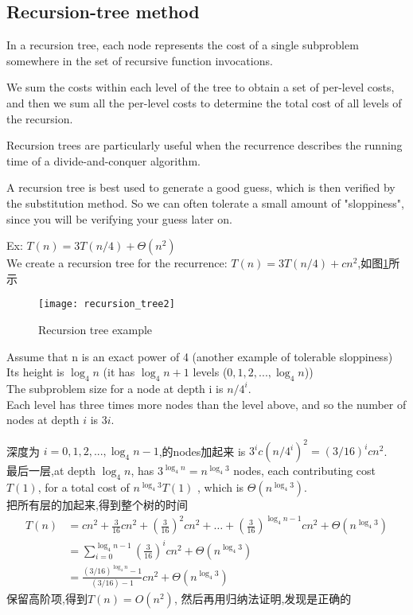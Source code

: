 \documentclass{article}
\begin{document}
\subsection{Recursion-tree method}
In a recursion tree, each node represents the cost of a single subproblem somewhere in the set of recursive function invocations.

We sum the costs within each level of the tree to obtain a set of per-level costs, and then we sum all the per-level costs to
determine the total cost of all levels of the recursion.

Recursion trees are particularly useful when the recurrence describes the running time of a divide-and-conquer algorithm.

A recursion tree is best used to generate a good guess,
which is then verified by the substitution method. So we can often tolerate a small amount of "sloppiness", since you will be verifying your guess later on.

Ex:
$T(n) = 3T(n/4) + \Theta(n^2)$\\
We create a recursion tree for the recurrence: $T(n) = 3T(n/4) + cn^2$,如图\ref{fig.compute.recursion_tree2}所示
\begin{figure}[htbp]
  \centering
  \texttt{[image: recursion\_tree2]}\\
  \caption{Recursion tree example}\label{fig.compute.recursion_tree2}
\end{figure}

Assume that n is an exact power of 4 (another example of tolerable sloppiness)\\
Its height is $\log_4 n$ (it has $\log_4 n + 1$ levels ($0, 1, 2,..., \log_4 n$))\\
The subproblem size for a node at depth i is $n/4^i$.\\
Each level has three times more nodes than the level above, and so the number of nodes at depth $i$ is $3i$.

深度为 $i = 0, 1, 2,..., \log_4 n - 1$,的nodes加起来 is $3^i c(n/4^i)^2 = (3/16)^icn^2$.\\
最后一层,at depth $\log_4n$, has $3^{\log_4 n} = n^{\log_4 3}$ nodes, each contributing cost $T(1)$, for a total cost of $n^{\log_4 3}T(1)$ , which is $\Theta(n^{\log_4 3})$.\\
把所有层的加起来,得到整个树的时间
\begin{equation}
\begin{split}
		T(n) & = cn^2 + \frac{3}{16} cn^2 + (\frac{3}{16})^2 cn^2 + \dots + (\frac{3}{16})^{\log_4 n - 1}cn^2 + \Theta(n^{\log_4 3}) \\
				   & = \sum_{i=0}^{\log_4 n - 1}(\frac{3}{16})^i cn^2 + \Theta(n^{\log_4 3}) \\
				   & = \frac{(3/16)^{\log_4 n} - 1}{(3/16)-1} cn^2 + \Theta(n^{\log_4 3})
\end{split}
\end{equation}
保留高阶项,得到$T(n)=O(n^2)$,
然后再用归纳法证明,发现是正确的
\end{document}
